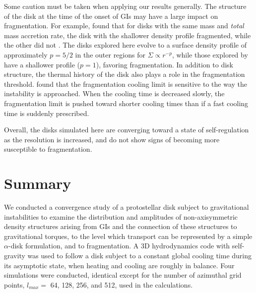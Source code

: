 \documentclass[manuscript]{aastex}
\begin{document}
Some caution must be taken when applying our results generally.  The structure of the disk at the time of the onset of GIs may have a large impact on fragmentation.  For example, \cite{boley2009} found that for disks with the same mass and {\it total} mass accretion rate, the disk with the shallower density profile fragmented, while the other did not \citep[see also ][]{meru2011b}.  The disks explored here evolve to a surface density profile of approximately $p=5/2$ in the outer regions for $\Sigma\propto r^{-p}$, while those explored by \citet{meru2011a} have a shallower profile ($p=1$), favoring fragmentation.  In addition to disk structure, the thermal history of the disk also plays a role in the fragmentation threshold.  \cite{clarke2007}  found that the fragmentation cooling limit is sensitive to the way the instability is approached.  When the cooling time is decreased slowly, the fragmentation limit is pushed toward shorter cooling times than if a fast cooling time is suddenly prescribed.  

Overall, the disks simulated here are converging toward a state of self-regulation as the resolution is increased, and do not show signs of becoming more susceptible to fragmentation. 


\section{Summary}

We conducted a convergence study of a protostellar disk subject to gravitational instabilities to
examine the distribution and amplitudes 
of non-axisymmetric density structures arising from GIs 
and the connection of these structures to gravitational torques,
to the level which transport can be represented by a simple $\alpha$-disk formulation,
and to fragmentation.
A 3D hydrodynamics code with self-gravity
was used to follow a disk subject to a constant global cooling time during its asymptotic state, when
heating and cooling are roughly in balance.
Four simulations were conducted, identical except for the number of azimuthal grid 
points, $l_{max} = $ 64, 128, 256, and 512, used in the calculations.
\end{document}
